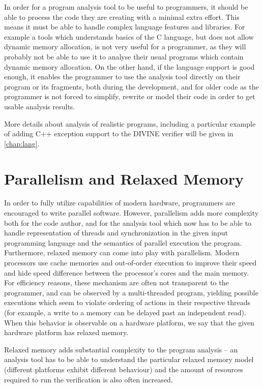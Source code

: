In order for a program analysis tool to be useful to programmers, it should be able to process the code they are creating with a minimal extra effort.
This means it must be able to handle complex language features and libraries.
For example a tools which understands basics of the C language, but does not allow dynamic memory allocation, is not very useful for a programmer, as they will probably not be able to  use it to analyse their usual programs which contain dynamic memory allocation.
On the other hand, if the language support is good enough, it enables the programmer to use the analysis tool directly on their program or its fragments, both during the development, and for older code as the programmer is not forced to simplify, rewrite or model their code in order to get usable analysis results.

More details about analysis of realistic programs, including a particular
example of adding C++ exception support to the DIVINE verifier will be given in
\autoref{chap:lang}.

\section{Parallelism and Relaxed Memory}

In order to fully utilize capabilities of modern hardware, programmers are encouraged to write parallel software.
However, parallelism adds more complexity both for the code author, and for the analysis tool which now has to be able to handle representation of threads and synchronization in the given input programming language and the semantics of parallel execution the program.
Furthermore, relaxed memory can come into play with parallelism.
Modern processors use cache memories and out-of-order execution to improve their speed and hide speed difference between the processor's cores and the main memory.
For efficiency reasons, these mechanism are often not transparent to the programmer, and can be observed by a multi-threaded program, yielding possible executions which seem to violate ordering of actions in their respective threads (for example, a write to a memory can be delayed past an independent read).
When this behavior is observable on a hardware platform, we say that the given hardware platform has relaxed memory.

Relaxed memory adds substantial complexity to the program analysis --
an analysis tool has to be able to understand the particular relaxed memory model (different platforms exhibit different behaviour) and the amount of resources required to run the verification is also often increased.

